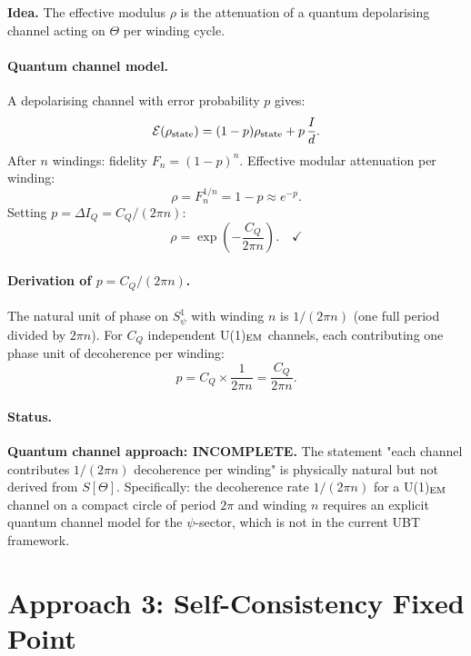 \documentclass[12pt,a4paper]{article}
\theoremstyle{definition}\newtheorem{definition}[theorem]{Definition}
\theoremstyle{remark}\newtheorem{remark}[theorem]{Remark}
\begin{document}
\begin{insightbox}
\textbf{Idea.}
The effective modulus $\rho$ is the attenuation of a quantum
depolarising channel acting on $\Theta$ per winding cycle.
\end{insightbox}

\paragraph{Quantum channel model.}
A depolarising channel with error probability $p$ gives:
\[
  \mathcal{E}(\rho_{\rm state})
  = (1-p)\rho_{\rm state} + p\,\frac{I}{d}.
\]
After $n$ windings: fidelity $F_n = (1-p)^n$.
Effective modular attenuation per winding:
\[
  \rho = F_n^{1/n} = 1-p \approx e^{-p}.
\]
Setting $p = \Delta I_Q = C_Q/(2\pi n)$:
\[
  \rho = \exp\!\left(-\frac{C_Q}{2\pi n}\right). \quad \checkmark
\]

\paragraph{Derivation of $p = C_Q/(2\pi n)$.}
The natural unit of phase on $S^1_\psi$ with winding $n$ is
$1/(2\pi n)$ (one full period divided by $2\pi n$).
For $C_Q$ independent U(1)$_{\rm EM}$ channels, each contributing
one phase unit of decoherence per winding:
\[
  p = C_Q \times \frac{1}{2\pi n} = \frac{C_Q}{2\pi n}.
\]

\paragraph{Status.}
\begin{deadendbox}
\textbf{Quantum channel approach: INCOMPLETE.}
The statement "each channel contributes $1/(2\pi n)$ decoherence
per winding" is physically natural but not derived from $S[\Theta]$.
Specifically: the decoherence rate $1/(2\pi n)$ for a U(1)$_{\rm EM}$
channel on a compact circle of period $2\pi$ and winding $n$ requires
an explicit quantum channel model for the $\psi$-sector, which is
not in the current UBT framework.
\end{deadendbox}

\section{Approach 3: Self-Consistency Fixed Point}
\label{sec:selfcons}
\end{document}

